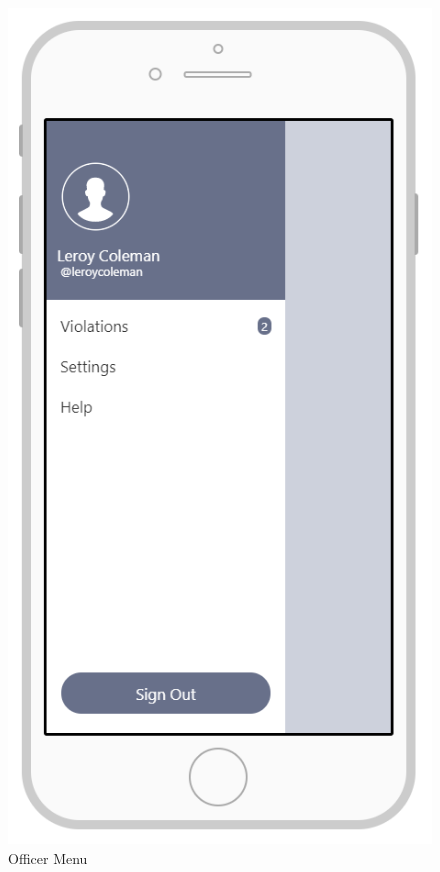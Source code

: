 \documentclass{article}
\begin{document}
\begin{figure}[H]
    \centering
    \includegraphics[scale=0.7]{Images/MenuOfficerAPP}
    \caption{Officer Menu}
\end{figure}
\end{document}
